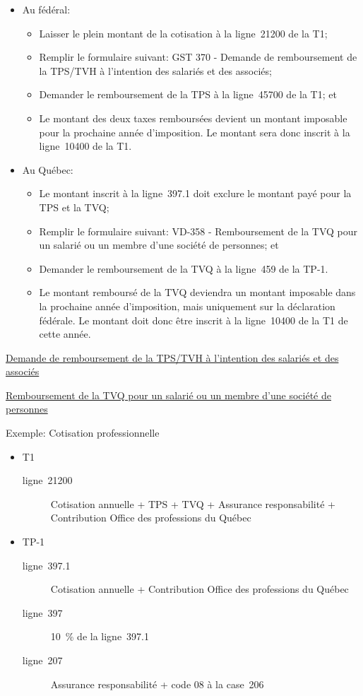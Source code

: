 \begin{itemize}
	\item Au fédéral:
	\begin{itemize}
		\item Laisser le plein montant de la cotisation à la ligne~21200 de la T1;
		\item Remplir le formulaire suivant: GST 370 - Demande de remboursement de la TPS/TVH à l'intention des salariés et des associés;
		\item Demander le remboursement de la TPS à la ligne~45700 de la T1; et
		\item Le montant des deux taxes remboursées devient un montant imposable pour la prochaine année d'imposition. Le montant sera donc inscrit à la ligne~10400 de la T1.
	\end{itemize}
	\item Au Québec:
	\begin{itemize}
		\item Le montant inscrit à la ligne~397.1 doit exclure le montant payé pour la TPS et la TVQ;
		\item Remplir le formulaire suivant: VD-358 - Remboursement de la TVQ pour un salarié ou un membre d'une société de personnes; et
		\item Demander le remboursement de la TVQ à la ligne~459 de la TP-1.
		\item Le montant remboursé de la TVQ deviendra un montant imposable dans la prochaine année d'imposition, mais uniquement sur la déclaration fédérale. Le montant doit donc être inscrit à la ligne~10400 de la T1 de cette année.
	\end{itemize}
\end{itemize}

\cat\href{https://www.canada.ca/content/dam/cra-arc/formspubs/pbg/gst370/gst370-22f.pdf}{Demande de remboursement de la TPS/TVH à l'intention des salariés et des associés}

\qct\href{https://www.revenuquebec.ca/fr/services-en-ligne/formulaires-et-publications/details-courant/vd-358/}{Remboursement de la TVQ pour un salarié ou un membre d'une société de personnes}

Exemple: Cotisation professionnelle
\begin{itemize}
	\item T1
	\begin{description}
		\item[ligne~21200] Cotisation annuelle + TPS + TVQ + Assurance responsabilité + Contribution Office des professions du Québec
	\end{description}
	\item TP-1
	\begin{description}
		\item[ligne~397.1] Cotisation annuelle + Contribution Office des professions du Québec
		\item[ligne~397] 10~\% de la ligne~397.1
		\item[ligne~207]  Assurance responsabilité + code 08 à la case~206
	\end{description}
\end{itemize}



